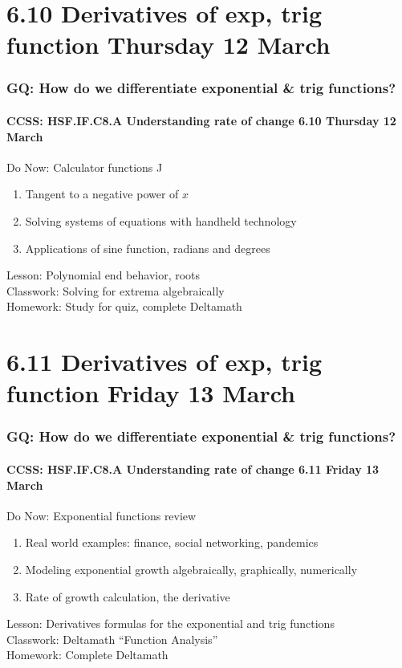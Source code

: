 \documentclass{beamer}
\begin{document}
\section{6.10 Derivatives of exp, trig function \hfill Thursday 12 March}
  \frame
  {
    \frametitle{GQ: How do we differentiate exponential \& trig functions?}
    \framesubtitle{CCSS: HSF.IF.C8.A Understanding rate of change \hfill \alert{6.10 Thursday 12 March}}
    \begin{block}{Do Now: Calculator functions J}
      \begin{enumerate}
        \item Tangent to a negative power of $x$
        \item Solving systems of equations with handheld technology
        \item Applications of sine function, radians and degrees
      \end{enumerate}
      \end{block}
      Lesson: Polynomial end behavior, roots \\
      Classwork: Solving for extrema algebraically \\ 
      Homework: Study for quiz, complete Deltamath
      }

\section{6.11 Derivatives of exp, trig function \hfill Friday 13 March}
  \frame
  {
    \frametitle{GQ: How do we differentiate exponential \& trig functions?}
    \framesubtitle{CCSS: HSF.IF.C8.A Understanding rate of change \hfill \alert{6.11 Friday 13 March}}
    \begin{block}{Do Now: Exponential functions review}
      \begin{enumerate}
        \item Real world examples: finance, social networking, pandemics
        \item Modeling exponential growth algebraically, graphically, numerically
        \item Rate of growth calculation, the derivative
      \end{enumerate}
      \end{block}
      Lesson: Derivatives formulas for the exponential and trig functions \\
      Classwork: Deltamath ``Function Analysis'' \\ 
      Homework: Complete Deltamath
      }
\end{document}
